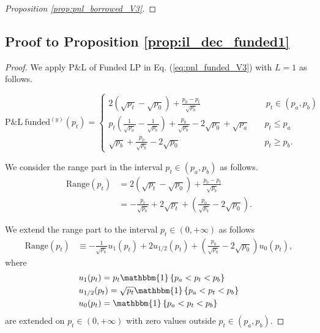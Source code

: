 \documentclass[pdftex,11pt,a4paper] {article}
\begin{document}
\begin{proof} [Proposition \ref{prop:pnl_borrowed_V3}]
\end{proof}

\subsection{Proof to Proposition \protect\ref{prop:il_dec_funded1}}

\label{ap_prop:il_dec_funded1}
\begin{proof}

We apply P\&L of Funded LP in Eq. (\ref{eq:pnl_funded_V3}) with $L=1$ as follows.

\begin{equation} \label{eq:ilf1}
\mathrm{P\&L \ funded}^{(y)}(p_{t}) = \begin{cases}
 2\left(\sqrt{p_{t}} -\sqrt{p_{0}} \right)  +   \frac{p_{0}-p_{t}}{\sqrt{p_{b}}}  \quad & \, p_{t} \in (p_{a}, p_{b}) \\
  p_{t} \left(\frac{1}{\sqrt{p_{a}}} - \frac{1}{\sqrt{p_{b}}}\right) + \frac{p_{0}}{\sqrt{p_{b}}}  - 2\sqrt{p_{0}} + \sqrt{p_{a}}  \quad & p_{t} \leq p_{a} \\
\sqrt{p_{b}}  + \frac{p_{0}}{\sqrt{p_{b}}}  - 2\sqrt{p_{0}}\quad & p_{t}  \geq  p_{b}.
     \end{cases}
\end{equation}

We consider the range part in the interval $p_{t} \in (p_{a}, p_{b}) $ as follows.
\begin{equation} \label{eq:ilf1a}
\begin{split}
\mathrm{Range}(p_{t})&  =  2\left(\sqrt{p_{t}} -\sqrt{p_{0}} \right)  +   \frac{p_{0}-p_{t}}{\sqrt{p_{b}}}  \\
& = - \frac{p_{t}}{\sqrt{p_{b}}} + 2\sqrt{p_{t}} + \left(\frac{p_{0}}{\sqrt{p_{b}}}-2\sqrt{p_{0}}\right).
\end{split}
\end{equation}


We extend the range part to the interval $p_{t}\in\left(0, +\infty\right)$ as follows
\begin{equation} \label{eq:ilf2}
\begin{split}
\mathrm{Range}(p_{t})&  \equiv - \frac{1}{\sqrt{p_{b}}}u_{1}(p_{t}) + 2u_{1/2}(p_{t}) + \left(\frac{p_{0}}{\sqrt{p_{b}}}-2\sqrt{p_{0}}\right)u_{0}(p_{t}),
\end{split}
\end{equation}
where
\begin{equation} \label{eq:ilf3}
\begin{split}
& u_{1}(p_{t})  = p_{t} \mathbbm{1}\left\{ p_{a} < p_{t} < p_{b}\right\} \\
& u_{1/2}(p_{t})  =  \sqrt{p_{t}} \mathbbm{1}\left\{ p_{a} < p_{t} < p_{b}\right\}\\
& u_{0}(p_{t}) = \mathbbm{1}\left\{ p_{a} < p_{t} < p_{b}\right\}
\end{split}
\end{equation}
are extended on $p_{t}\in\left(0, +\infty\right)$ with zero values outside $p_{t} \in (p_{a}, p_{b}) $.



\end{proof}
\end{document}
